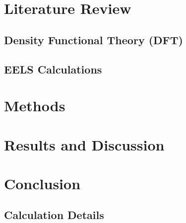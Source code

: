 \documentclass[12pt]{report}
\begin{document}



\chapter{Literature Review}\label{literature_review}

\section{Density Functional Theory (DFT)}\label{dft_section}

\section{EELS Calculations}\label{ELNES_section}

\chapter{Methods}\label{methods}

\chapter{Results and Discussion}\label{results}

\chapter{Conclusion}\label{conclusion}


\begin{appendices}

\chapter{Calculation Details} \label{calc_details}






\end{appendices}







\end{document}
